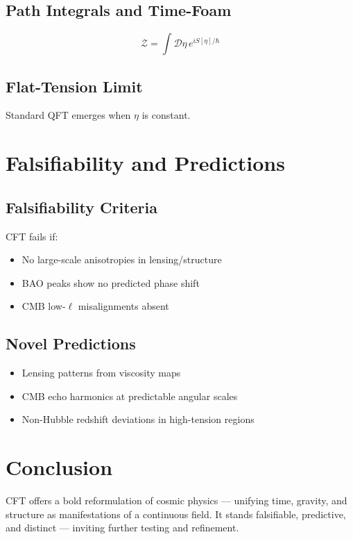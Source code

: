 \documentclass[11pt]{article}
\begin{document}
\subsection{Path Integrals and Time-Foam}
\[
\mathcal{Z} = \int \mathcal{D}\eta \, e^{i S[\eta]/\hbar}
\]

\subsection{Flat-Tension Limit}
Standard QFT emerges when $\eta$ is constant.

\section{Falsifiability and Predictions}
\subsection{Falsifiability Criteria}
CFT fails if:
\begin{itemize}
    \item No large-scale anisotropies in lensing/structure
    \item BAO peaks show no predicted phase shift
    \item CMB low-$\ell$ misalignments absent
\end{itemize}

\subsection{Novel Predictions}
\begin{itemize}
    \item Lensing patterns from viscosity maps
    \item CMB echo harmonics at predictable angular scales
    \item Non-Hubble redshift deviations in high-tension regions
\end{itemize}

\section*{Conclusion}
CFT offers a bold reformulation of cosmic physics — unifying time, gravity, and structure as manifestations of a continuous field. It stands falsifiable, predictive, and distinct — inviting further testing and refinement.
\end{document}
